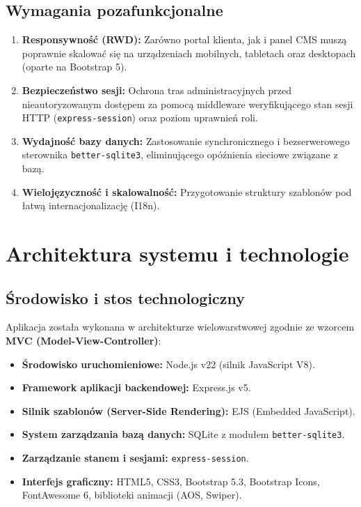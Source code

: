 \documentclass[12pt,a4paper]{article}
\begin{document}
\subsection{Wymagania pozafunkcjonalne}
\begin{enumerate}
    \item \textbf{Responsywność (RWD):} Zarówno portal klienta, jak i panel CMS muszą poprawnie skalować się na urządzeniach mobilnych, tabletach oraz desktopach (oparte na Bootstrap 5).
    \item \textbf{Bezpieczeństwo sesji:} Ochrona tras administracyjnych przed nieautoryzowanym dostępem za pomocą middleware weryfikującego stan sesji HTTP (\texttt{express-session}) oraz poziom uprawnień roli.
    \item \textbf{Wydajność bazy danych:} Zastosowanie synchronicznego i bezserwerowego sterownika \texttt{better-sqlite3}, eliminującego opóźnienia sieciowe związane z bazą.
    \item \textbf{Wielojęzyczność i skalowalność:} Przygotowanie struktury szablonów pod łatwą internacjonalizację (I18n).
\end{enumerate}

\section{Architektura systemu i technologie}

\subsection{Środowisko i stos technologiczny}
Aplikacja została wykonana w architekturze wielowarstwowej zgodnie ze wzorcem \textbf{MVC (Model-View-Controller)}:
\begin{itemize}
    \item \textbf{Środowisko uruchomieniowe:} Node.js v22 (silnik JavaScript V8).
    \item \textbf{Framework aplikacji backendowej:} Express.js v5.
    \item \textbf{Silnik szablonów (Server-Side Rendering):} EJS (Embedded JavaScript).
    \item \textbf{System zarządzania bazą danych:} SQLite z modułem \texttt{better-sqlite3}.
    \item \textbf{Zarządzanie stanem i sesjami:} \texttt{express-session}.
    \item \textbf{Interfejs graficzny:} HTML5, CSS3, Bootstrap 5.3, Bootstrap Icons, FontAwesome 6, biblioteki animacji (AOS, Swiper).
\end{itemize}
\end{document}
